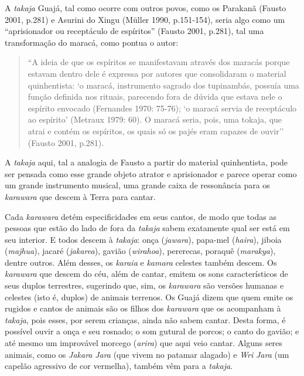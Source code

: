 A \emph{takaja} Guajá, tal como ocorre com outros povos, como os
Parakanã (Fausto 2001, p.281) e Asurini do Xingu (Müller 1990,
p.151-154), seria algo como um ``aprisionador ou receptáculo de
espíritos'' (Fausto 2001, p.281), tal uma transformação do maracá, como
pontua o autor:

\begin{quote}
``A ideia de que os espíritos se manifestavam através dos maracás porque
estavam dentro dele é expressa por autores que consolidaram o material
quinhentista: `o maracá, instrumento sagrado dos tupinambás, possuía uma
função definida nos rituais, parecendo fora de dúvida que estava nele o
espírito envocado (Fernandes 1970: 75-76); `o maracá servia de
receptáculo ao espírito' (Metraux 1979: 60). O maracá seria, pois, uma
tokaja, que atrai e contém os espíritos, os quais só os pajés eram
capazes de ouvir'' (Fausto 2001, p.281).
\end{quote}

A \emph{takaja} aqui, tal a analogia de Fausto a partir do material
quinhentista, pode ser pensada como esse grande objeto atrator e
aprisionador e parece operar como um grande instrumento musical, uma
grande caixa de ressonância para os \emph{karawara} que descem à Terra
para cantar.

Cada \emph{karawara} detém especificidades em seus cantos, de modo que
todas as pessoas que estão do lado de fora da \emph{takaja} sabem
exatamente qual ser está em seu interior. E todos descem à
\emph{takaja}: onça (\emph{jawara}), papa-mel (\emph{haira}), jiboia
(\emph{majhua}), jacaré (\emph{jakarea}), gavião (\emph{wirahoa}),
pererecas, poraquê (\emph{marakya}), dentre outros. Além desses, os
\emph{karaia} e \emph{kamara} celestes também descem. Os \emph{karawara}
que descem do céu, além de cantar, emitem os sons característicos de
seus duplos terrestres, sugerindo que, sim, os \emph{karawara} são
versões humanas e celestes (isto é, duplos) de animais terrenos. Os
Guajá dizem que quem emite os rugidos e cantos de animais são os filhos
dos \emph{karawara} que os acompanham à \emph{takaja}, pois esses, por
serem crianças, ainda não sabem cantar. Desta forma, é possível ouvir a
onça e seu rosnado; o som gutural de porcos; o canto do gavião; e até
mesmo um improvável morcego (\emph{arira}) que aqui veio cantar. Alguns
seres animais, como os \emph{Jakara} \emph{Jara} (que vivem no patamar
alagado) e \emph{Wri} \emph{Jara} (um capelão agressivo de cor
vermelha), também vêm para a \emph{takaja}.

